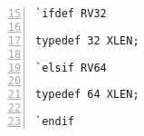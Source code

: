 {\small
\begin{Verbatim}[frame=single, numbers=left, firstnumber=15, label=src\_Common/Arch.bsv]
`ifdef RV32

typedef 32 XLEN;

`elsif RV64

typedef 64 XLEN;

`endif
\end{Verbatim}
}
